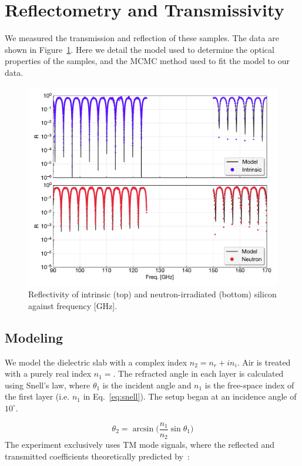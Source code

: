 \section{Reflectometry and Transmissivity}
We measured the transmission and reflection of these samples. The data are shown in Figure~\ref{fig:si_data}.  Here we detail the model used to determine the optical properties of the samples, and the MCMC method used to fit the model to our data.
\begin{figure}[t]
    \centering
    \includegraphics[width = \textwidth]{Figures/silicon_refl.pdf}
    \caption{Reflectivity of intrinsic (top) and neutron-irradiated (bottom) silicon against frequency [GHz].}
    \label{fig:si_data}
\end{figure}
\subsection{Modeling}
\label{subsec:mcmc}
We model the dielectric slab with a complex index $n_2 = n_r + in_i$.  Air is treated with a purely real index $n_1 = $. The refracted angle in each layer is calculated using Snell's law, where $\theta_1$ is the incident angle and $n_1$ is the free-space
index of the first layer (i.e. $n_1$ in Eq.~\ref{eq:snell}). The setup began at an incidence angle of $10^{\circ}$.

\begin{equation}
    \theta_2 = \arcsin\bigg(\frac{n_1}{n_2}\sin\theta_1\bigg)
    \label{eq:snell}
\end{equation}
The experiment exclusively uses TM mode signals, where the reflected and transmitted coefficients theoretically
predicted by~\cite{jackson}:


